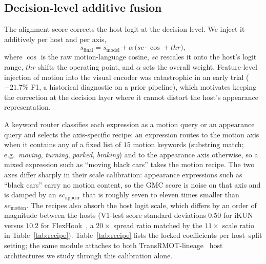\documentclass[sigconf,review,anonymous]{acmart}
\begin{document}
\subsection{Decision-level additive fusion}
\label{sec:fusion}

The alignment score corrects the host logit at the decision level. We inject it additively per host and per axis,
\begin{equation}
s_{\mathrm{final}} = s_{\mathrm{model}} + \alpha\,\bigl(\mathit{sc}\cdot\cos + \mathit{thr}\bigr),
\label{eq:fusion}
\end{equation}
where $\cos$ is the raw motion-language cosine, $\mathit{sc}$ rescales it onto the host's logit range, $\mathit{thr}$ shifts the operating point, and $\alpha$ sets the overall weight. Feature-level injection of motion into the visual encoder was catastrophic in an early trial ($-21.7\%$ F1, a historical diagnostic on a prior pipeline), which motivates keeping the correction at the decision layer where it cannot distort the host's appearance representation.

A keyword router classifies each expression as a motion query or an appearance query and selects the axis-specific recipe: an expression routes to the motion axis when it contains any of a fixed list of $15$ motion keywords (substring match; e.g.\ \emph{moving}, \emph{turning}, \emph{parked}, \emph{braking}) and to the appearance axis otherwise, so a mixed expression such as ``moving black cars'' takes the motion recipe. The two axes differ sharply in their scale calibration: appearance expressions such as ``black cars'' carry no motion content, so the GMC score is noise on that axis and is damped by an $\mathit{sc}_{\mathrm{appear}}$ that is roughly seven to eleven times smaller than $\mathit{sc}_{\mathrm{motion}}$. The recipes also absorb the host logit scale, which differs by an order of magnitude between the hosts (V1-test score standard deviations $0.50$ for iKUN~\cite{ikun} versus $10.2$ for FlexHook~\cite{flexhook}, a $20\times$ spread ratio matched by the $11\times$ scale ratio in Table~\ref{tab:recipe}). Table~\ref{tab:recipe} lists the locked coefficients per host--split setting; the same module attaches to both TransRMOT-lineage~\cite{transrmot} host architectures we study through this calibration alone.
\end{document}
